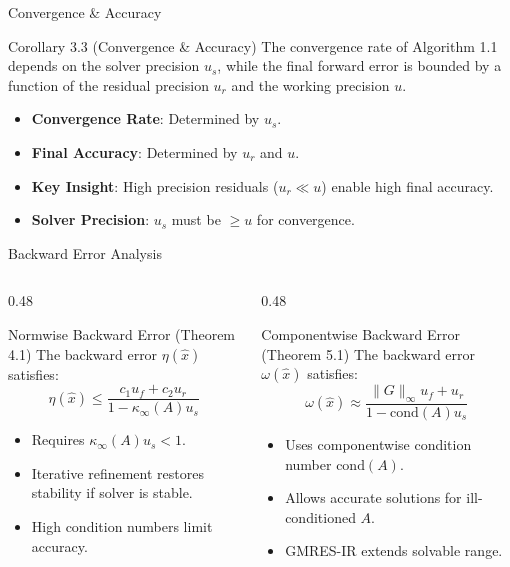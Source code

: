 \documentclass[
	11pt,
	aspectratio=169,
]{beamer}
\begin{document}
\begin{frame}{Convergence \& Accuracy}
    \begin{block}{Corollary 3.3 (Convergence \& Accuracy)}
The convergence rate of Algorithm 1.1 depends on the solver precision $u_s$, while the final forward error is bounded by a function of the residual precision $u_r$ and the working precision $u$.
\end{block}

\begin{itemize}
    \item \textbf{Convergence Rate}: Determined by $u_s$.
    \item \textbf{Final Accuracy}: Determined by $u_r$ and $u$.
    \item \textbf{Key Insight}: High precision residuals ($u_r \ll u$) enable high final accuracy.
    \item \textbf{Solver Precision}: $u_s$ must be $\geq u$ for convergence.
\end{itemize}
\end{frame}
\begin{frame}{Backward Error Analysis}
    \begin{columns}[T,onlytextwidth]
    \begin{column}{0.48\textwidth}
        \begin{block}{Normwise Backward Error (Theorem 4.1)}
        The backward error $\eta(\hat{x})$ satisfies:
        \begin{equation*}
        \eta(\hat{x}) \leq \frac{c_1 u_f + c_2 u_r}{1 - \kappa_\infty(A) u_s}
        \end{equation*}
        \end{block}
        \begin{itemize}
            \item Requires $\kappa_\infty(A) u_s < 1$.
            \item Iterative refinement restores stability if solver is stable.
            \item High condition numbers limit accuracy.
        \end{itemize}
    \end{column}
    \begin{column}{0.48\textwidth}
        \begin{block}{Componentwise Backward Error (Theorem 5.1)}
        The backward error $\omega(\hat{x})$ satisfies:
        \begin{equation*}
        \omega(\hat{x}) \approx \frac{\|G\|_\infty u_f + u_r}{1 - \text{cond}(A) u_s}
        \end{equation*}
        \end{block}
        \begin{itemize}
            \item Uses componentwise condition number $\text{cond}(A)$.
            \item Allows accurate solutions for ill-conditioned $A$.
            \item GMRES-IR extends solvable range.
        \end{itemize}
    \end{column}
\end{columns}
\end{frame}
\end{document}
